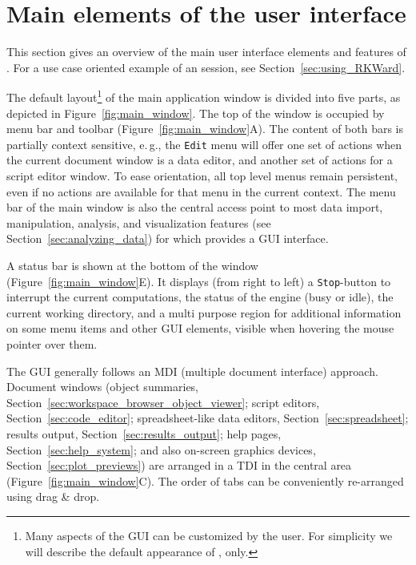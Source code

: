 \section{Main elements of the user interface}
\label{sec:user_interface}
This section gives an overview of the main user interface elements and features of .
For a use case oriented example of an  session, see Section~\ref{sec:using_RKWard}.

The default layout\footnote{
 Many aspects of the  GUI can be customized by the user. For simplicity we will
 describe the default appearance of , only. 
} of the main application window is divided into five
parts, as depicted in Figure~\ref{fig:main_window}. The top of the window is occupied by menu bar and toolbar 
(Figure~\ref{fig:main_window}A). The content of both bars is partially context
sensitive, e.\,g., the \texttt{Edit} menu will offer
one set of actions when the current document window is a data editor,
and another set of actions for a  script
editor window. To ease orientation, all top level menus remain
persistent, even if no actions are available for that menu in the
current context. The menu bar of the main window is also the central
access point to most data import, manipulation, analysis, and
visualization features (see Section~\ref{sec:analyzing_data}) for which  provides a GUI
interface.

A status bar is shown at the bottom of the window (Figure~\ref{fig:main_window}E). It displays (from
right to left) a \texttt{Stop}-button to interrupt the current computations,
the status of the  engine (busy or idle), the
current working directory, and a multi purpose region for additional
information on some menu items and other GUI elements, visible when
hovering the mouse pointer over them.

The  GUI generally follows an MDI (multiple document interface) approach.
Document windows (object summaries, Section~\ref{sec:workspace_browser_object_viewer};
    script editors, Section~\ref{sec:code_editor}; spreadsheet-like data editors, Section~\ref{sec:spreadsheet};
    results output, Section~\ref{sec:results_output}; help pages, Section~\ref{sec:help_system}; and also
     on-screen graphics devices, Section~\ref{sec:plot_previews}) 
are arranged in a TDI \citep[tabbed document interface; see e.\,g.,][]{Hopkins2005, MDN2010, KimLutteroth2010}
in the central area (Figure~\ref{fig:main_window}C). The order
of tabs can be conveniently re-arranged using drag \& drop.

